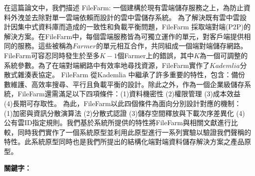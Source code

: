\begin{abstractzh}
  在這篇論文中，我們描述 FileFarm: 一個建構於現有雲端儲存服務之上，為防止資料外洩並去除對單一雲端依賴而設計的雲中雲儲存系統。 為了解決既有雲中雲設計因集中式資料庫而造成的一致性和負載平衡問題，FileFarm 採取端對端(P2P)的解決方案。在FileFarm中，每個雲端服務皆為可獨立運作的單元，對客戶端提供相同的服務。這些被稱為$Farmer$的單元相互合作，共同組成一個端對端儲存網路。FileFarm可容忍同時發生於至多$K-1$個Farmer上的錯誤，其中$K$為一個可調整的系統參數。為了在端對端網路中有效率地尋找資源，FileFarm實作了$Kademlia$分散式雜湊表協定\cite{maymounkov2002kademlia}。 FileFarm 從Kademlia 中繼承了許多重要的特性，包含：備份數維護、高效率搜尋、平行且負載平衡的設計。除此之外，作為一個企業級儲存系統，FileFarm還需滿足以下四項條件：(1)資料機密性 (2)權限管理 (3)成本效益 (4)長期可存取性。 為此，FileFarm以此四個條件為面向分別設計對應的機制： (1)加密與資訊分散演算法 (2)分散式認證 (3)儲存空間釋放與下載次序差異化 (4)公有雲ID指定規則。我們基於系統所提供的特性將FileFarm與相關文獻進行比較，同時我們實作了一個系統原型並利用此原型進行一系列實驗以驗證我們聲稱的特性。此系統原型同時也是我們所提出的結構化端對端資料儲存解決方案之產品原型。

\bigbreak
\noindent \textbf{關鍵字：}{\, \makeatletter \@keywordszh \makeatother}
\end{abstractzh}

